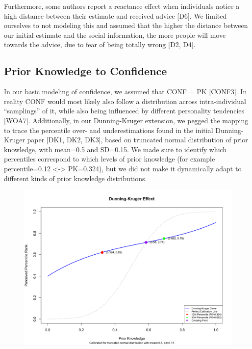 \documentclass[
  man,floatsintext]{apa6}
\begin{document}
Furthermore, some authors report a reactance effect when individuals notice a high distance between their estimate and received advice {[}D6{]}. We limited ourselves to not modeling this and assumed that the higher the distance between our initial estimate and the social information, the more people will move towards the advice, due to fear of being totally wrong {[}D2, D4{]}.

\hypertarget{prior-knowledge-to-confidence}{%
\subsection{Prior Knowledge to Confidence}\label{prior-knowledge-to-confidence}}

In our basic modeling of confidence, we assumed that CONF = PK {[}CONF3{]}. In reality CONF would most likely also follow a distribution across intra-individual ``samplings'' of it, while also being influenced by different personality tendencies {[}WOA7{]}. Additionally, in our Dunning-Kruger extension, we pegged the mapping to trace the percentile over- and underestimations found in the initial Dunning-Kruger paper {[}DK1, DK2, DK3{]}, based on truncated normal distribution of prior knowledge, with mean=0.5 and SD=0.15. We made sure to identify which percentiles correspond to which levels of prior knowledge (for example percentile=0.12 \textless-\textgreater{} PK=0.324), but we did not make it dynamically adapt to different kinds of prior knowledge distributions.

\begin{figure}[H]
\includegraphics[width=5.59in]{photos/dk} \caption{ }\label{fig:unnamed-chunk-2}
\end{figure}
\end{document}
